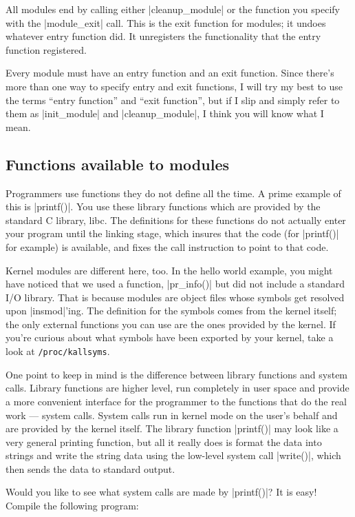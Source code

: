 \documentclass[10pt, oneside]{book}
\begin{document}
All modules end by calling either \cpp|cleanup_module| or the function you specify with the \cpp|module_exit| call.
This is the exit function for modules; it undoes whatever entry function did.
It unregisters the functionality that the entry function registered.

Every module must have an entry function and an exit function.
Since there's more than one way to specify entry and exit functions, I will try my best to use the terms ``entry function'' and ``exit function'', but if I slip and simply refer to them as \cpp|init_module| and \cpp|cleanup_module|, I think you will know what I mean.

\subsection{Functions available to modules}
\label{sec:avail_func}
Programmers use functions they do not define all the time.
A prime example of this is \cpp|printf()|.
You use these library functions which are provided by the standard C library, libc.
The definitions for these functions do not actually enter your program until the linking stage, which insures that the code (for \cpp|printf()| for example) is available, and fixes the call instruction to point to that code.

Kernel modules are different here, too. In the hello world example, you might have noticed that we used a function, \cpp|pr_info()| but did not include a standard I/O library.
That is because modules are object files whose symbols get resolved upon \sh|insmod|'ing.
The definition for the symbols comes from the kernel itself; the only external functions you can use are the ones provided by the kernel.
If you're curious about what symbols have been exported by your kernel, take a look at \verb|/proc/kallsyms|.

One point to keep in mind is the difference between library functions and system calls. Library functions are higher level, run completely in user space and provide a more convenient interface for the programmer to the functions that do the real work --- system calls.
System calls run in kernel mode on the user's behalf and are provided by the kernel itself.
The library function \cpp|printf()| may look like a very general printing function, but all it really does is format the data into strings and write the string data using the low-level system call \cpp|write()|, which then sends the data to standard output.

Would you like to see what system calls are made by \cpp|printf()|?
It is easy!
Compile the following program:
\end{document}
